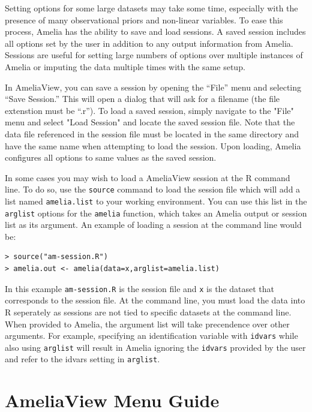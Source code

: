 \documentclass[12pt,titlepage]{article}
\begin{document}
Setting options for some large datasets may take some time, especially
with the presence of many observational priors and non-linear
variables.  To ease this process, Amelia has the ability to save and
load sessions.  A saved session includes all options set by the user
in addition to any output information from Amelia.  Sessions are
useful for setting large numbers of options over multiple instances of
Amelia or imputing the data multiple times with the same setup.

In AmeliaView, you can save a session by opening the ``File'' menu and
selecting ``Save Session.''  This will open a dialog that will ask for
a filename (the file extenstion must be ``.r'').  To load a saved
session, simply navigate to the "File" menu and select "Load Session"
and locate the saved session file.  Note that the data file referenced
in the session file must be located in the same directory and have the
same name when attempting to load the session.  Upon loading, Amelia
configures all options to same values as the saved session.

In some cases you may wish to load a AmeliaView session at the R
command line.  To do so, use the \texttt{source} command to load the
session file which will add a list named \texttt{amelia.list} to your
working environment.  You can use this list in the \texttt{arglist}
options for the \texttt{amelia} function, which takes an Amelia output
or session list as its argument.  An example of loading a session at
the command line would be:

\begin{verbatim}
> source("am-session.R") 
> amelia.out <- amelia(data=x,arglist=amelia.list)
\end{verbatim}

In this example \texttt{am-session.R} is the session file and
\texttt{x} is the dataset that corresponds to the session file.  At
the command line, you must load the data into R seperately as sessions
are not tied to specific datasets at the command line.  When provided
to Amelia, the argument list will take precendence over other
arguments.  For example, specifying an identification variable with
\texttt{idvars} while also using \texttt{arglist} will result in
Amelia ignoring the \texttt{idvars} provided by the user and refer to
the idvars setting in \texttt{arglist}.

\section{AmeliaView Menu Guide}
\label{sec:menu}
\end{document}
